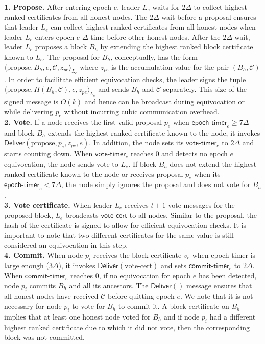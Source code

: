 \documentclass[letterpaper,twocolumn,10pt]{article}
\theoremstyle{definition}
\theoremstyle{remark}
\begin{document}
\textbf{1. Propose.} After entering epoch $e$, leader $L_e$ waits for $2 \Delta$ to collect highest ranked certificates from all honest nodes. The $2 \Delta$ wait before a proposal ensures that leader $L_e$ can collect highest ranked certificates from all honest nodes when leader $L_e$ enters epoch $e$ $\Delta$ time before other honest nodes. After the $2 \Delta$ wait, leader $L_e$ proposes a block $B_h$ by extending the highest ranked block certificate known to $L_e$. The proposal for $B_h$, conceptually, has the form $\langle \text{propose}, B_h, e, \mathcal{C}, z_{pe} \rangle_{L_e}$ where $z_{pe}$ is the accumulation value for the pair $(B_h, \mathcal{C})$. In order to facilitate efficient equivocation checks, the leader signs the tuple $\langle \text{propose}, H(B_h, \mathcal{C}), e, z_{pe} \rangle_{L_e}$ and sends $B_h$ and $\mathcal{C}$ separately. This size of the signed message is $O(k)$ and hence can be broadcast during equivocation or while delivering $p_e$ without incurring cubic communication overhead.\\

\textbf{2. Vote.} If a node receives the first valid proposal $p_e$ when $\mathsf{epoch\mbox{-}timer}_e \geq 7 \Delta$ and block $B_h$ extends the highest ranked certificate known to the node, it invokes $\mathsf{Deliver}(\text{propose}, p_e, z_{pe}, e)$. In addition, the node sets its $\mathsf{vote\mbox{-}timer}_e$ to $2 \Delta$ and starts counting down. When $\mathsf{vote\mbox{-}timer}_e$ reaches 0 and detects no epoch $e$ equivocation, the node sends vote to $L_e$. If block $B_h$ does not extend the highest ranked certificate known to the node or receives proposal $p_e$ when its $\mathsf{epoch\mbox{-}timer}_e < 7 \Delta$, the node simply ignores the proposal and does not vote for $B_h$.\\

\textbf{3. Vote certificate.} When leader $L_e$ receives $t + 1$ vote messages for the proposed block, $L_e$ broadcasts $\mathsf{vote\mbox{-}cert}$ to all nodes. Similar to the proposal, the hash of the certificate is signed to allow for efficient equivocation checks. It is important to note that two different certificates for the same value is still considered an equivocation in this step.\\

\textbf{4. Commit.} When node $p_i$ receives the block certificate $v_e$ when epoch timer is large enough ($3 \Delta$), it invokes $\mathsf{Deliver}(\text{vote-cert})$ and sets $\mathsf{commit\mbox{-}timer}_e$ to $2 \Delta$. When $\mathsf{commit\mbox{-}timer}_e$ reaches 0, if no equivocation for epoch $e$ has been detected, node $p_i$ commits $B_h$ and all its ancestors. The $\mathsf{Deliver}()$ message ensures that all honest nodes have received $\mathcal{C}$ before quitting epoch $e$. We note that it is not necessary for node $p_i$ to vote for $B_h$ to commit it. A block certificate on $B_h$ implies that at least one honest node voted for $B_h$ and if node $p_i$ had a different highest ranked certificate due to which it did not vote, then the corresponding block was not committed.\\
\end{document}
